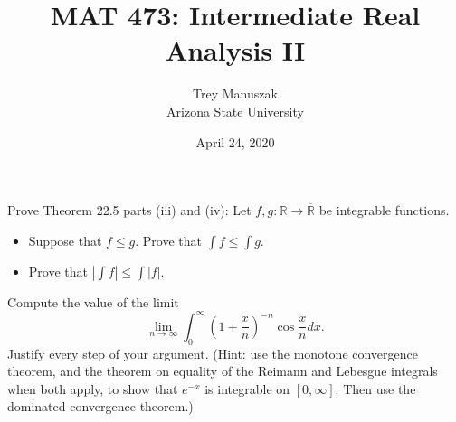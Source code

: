 \documentclass[12pt]{article}
\title{MAT 473: Intermediate Real Analysis II}
\date{April 24, 2020}
\author{Trey Manuszak\\ Arizona State University}
\newenvironment{problem}[2][Problem]{\begin{trivlist}
\item[\hskip \labelsep {\bfseries #1}\hskip \labelsep {\bfseries
#2.}]}{\end{trivlist}}
\begin{document}


\maketitle
\newpage


\begin{problem}{49}
Prove Theorem 22.5 parts (iii) and (iv): Let $f,g : \mathbb{R} \to \overline{\mathbb{R}}$ be integrable functions.
\begin{itemize}
  \item[(iii)] Suppose that $f \leq g$. Prove that $\int f \leq \int g$.
  \item[(iv)] Prove that $\left| \int f \right| \leq \int | f |$. 
\end{itemize}
\end{problem}

\begin{problem}{50}
Compute the value of the limit $$\lim_{n \to \infty} \int_{0}^{\infty}\left( 1 + \frac{x}{n} \right)^{-n}\cos \frac{x}{n}dx.$$ Justify every step of your argument. (Hint: use the monotone convergence theorem, and the theorem on equality of the Reimann and Lebesgue integrals when both apply, to show that $e^{-x}$ is integrable on $[0,\infty]$. Then use the dominated convergence theorem.)
\end{problem}
\end{document}
